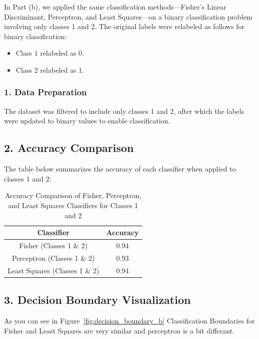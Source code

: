 \documentclass[a4paper, 11pt]{article}
\begin{document}
	In Part (b), we applied the same classification methods—Fisher’s Linear Discriminant, Perceptron, and Least Squares—on a binary classification problem involving only classes 1 and 2. The original labels were relabeled as follows for binary classification:
	\begin{itemize}
		\item Class 1 relabeled as 0.
		\item Class 2 relabeled as 1.
	\end{itemize}
	
	\subsubsection*{1. Data Preparation}
	
	The dataset was filtered to include only classes 1 and 2, after which the labels were updated to binary values to enable classification.
	
	\subsection*{2. Accuracy Comparison}
	
	The table below summarizes the accuracy of each classifier when applied to classes 1 and 2:
	
	\begin{table}[h!]
		\centering
		\begin{tabular}{|c|c|}
			\hline
			\textbf{Classifier} & \textbf{Accuracy} \\
			\hline
			Fisher (Classes 1 \& 2) & 0.94 \\ 
			Perceptron (Classes 1 \& 2) & 0.93 \\ 
			Least Squares (Classes 1 \& 2) & 0.94 \\ 
			\hline
		\end{tabular}
		\caption{Accuracy Comparison of Fisher, Perceptron, and Least Squares Classifiers for Classes 1 and 2}
	\end{table}
	
	\subsection*{3. Decision Boundary Visualization}
	
	As you can see in Figure~\ref{fig:decision_boundary_b} Classification Boundaries for Fisher and Least Squares are very similar and perceptron is a bit differant.
	
\end{document}
